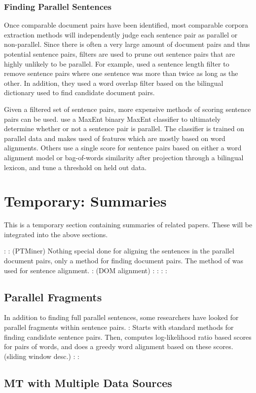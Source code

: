 \subsubsection{Finding Parallel Sentences}
Once comparable document pairs have been identified, most comparable corpora
extraction methods will independently judge each sentence pair as parallel or
non-parallel. Since there is often a very large amount of document pairs and
thus potential sentence pairs, filters are used to prune out sentence pairs that
are highly unlikely to be parallel. For example, \citet{Munteanu05} used a
sentence length filter to remove sentence pairs where one sentence was more than
twice as long as the other. In addition, they used a word overlap filter based
on the bilingual dictionary used to find candidate document pairs.

Given a filtered set of sentence pairs, more expensive methods of scoring
sentence pairs can be used. \citet{Munteanu05} use a MaxEnt binary MaxEnt
classifier to ultimately determine whether or not a sentence pair is parallel.
The classifier is trained on parallel data and makes used of features which are
mostly based on word alignments. Others
\cite{Fung04a,Fung04b,Tillmann09a,Tillmann09b} use a single score for sentence
pairs based on either a word alignment model or bag-of-words similarity after
projection through a bilingual lexicon, and tune a threshold on held out data.

\section{Temporary: Summaries}
This is a temporary section containing summaries of related papers. These will
be integrated into the above sections.

\citet{Dagan93}:
\citet{Chen00}: (PTMiner) Nothing special done for aligning the sentences in the 
parallel document pairs, only a method for finding document pairs. The method of
\citet{Simard93} was used for sentence alignment.
\citet{Shi06}: (DOM alignment)
\citet{Abdul-Rauf09}:
\citet{Ambati10}:
\citet{Ture11}:
\citet{Ture12}:

\subsection{Parallel Fragments}
In addition to finding full parallel sentences, some researchers have looked for
parallel fragments within sentence pairs.
\citet{Munteanu06}: Starts with standard methods for finding candidate sentence
pairs. Then, computes log-likelihood ratio based scores for pairs of words, and
does a greedy word alignment based on these scores. (sliding window desc.)
\citet{Quirk07}:
\citet{Riesa12}:

\subsection{MT with Multiple Data Sources}
